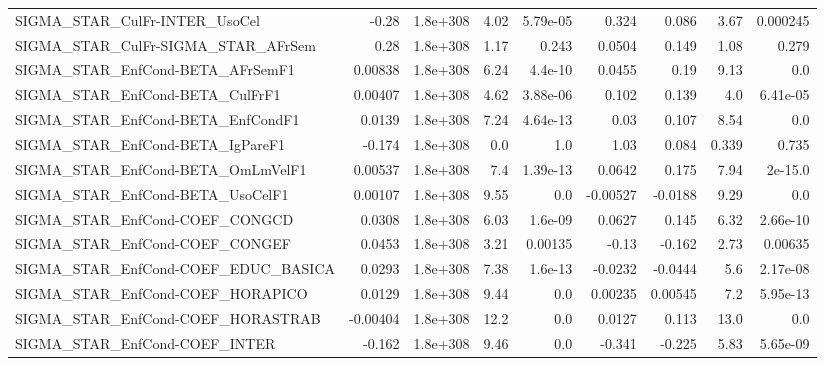 \begin{tabular}{lrrrrrrrr}
SIGMA\_STAR\_CulFr-INTER\_UsoCel         &       -0.28 &     1.8e+308 &    4.02 & 5.79e-05 &      0.324 &       0.086 &         3.67 &      0.000245 \\
SIGMA\_STAR\_CulFr-SIGMA\_STAR\_AFrSem    &        0.28 &     1.8e+308 &    1.17 &    0.243 &     0.0504 &       0.149 &         1.08 &         0.279 \\
SIGMA\_STAR\_EnfCond-BETA\_AFrSemF1      &     0.00838 &     1.8e+308 &    6.24 &  4.4e-10 &     0.0455 &        0.19 &         9.13 &           0.0 \\
SIGMA\_STAR\_EnfCond-BETA\_CulFrF1       &     0.00407 &     1.8e+308 &    4.62 & 3.88e-06 &      0.102 &       0.139 &          4.0 &      6.41e-05 \\
SIGMA\_STAR\_EnfCond-BETA\_EnfCondF1     &      0.0139 &     1.8e+308 &    7.24 & 4.64e-13 &       0.03 &       0.107 &         8.54 &           0.0 \\
SIGMA\_STAR\_EnfCond-BETA\_IgPareF1      &      -0.174 &     1.8e+308 &     0.0 &      1.0 &       1.03 &       0.084 &        0.339 &         0.735 \\
SIGMA\_STAR\_EnfCond-BETA\_OmLmVelF1     &     0.00537 &     1.8e+308 &     7.4 & 1.39e-13 &     0.0642 &       0.175 &         7.94 &       2e-15.0 \\
SIGMA\_STAR\_EnfCond-BETA\_UsoCelF1      &     0.00107 &     1.8e+308 &    9.55 &      0.0 &   -0.00527 &     -0.0188 &         9.29 &           0.0 \\
SIGMA\_STAR\_EnfCond-COEF\_CONGCD        &      0.0308 &     1.8e+308 &    6.03 &  1.6e-09 &     0.0627 &       0.145 &         6.32 &      2.66e-10 \\
SIGMA\_STAR\_EnfCond-COEF\_CONGEF        &      0.0453 &     1.8e+308 &    3.21 &  0.00135 &      -0.13 &      -0.162 &         2.73 &       0.00635 \\
SIGMA\_STAR\_EnfCond-COEF\_EDUC\_BASICA   &      0.0293 &     1.8e+308 &    7.38 &  1.6e-13 &    -0.0232 &     -0.0444 &          5.6 &      2.17e-08 \\
SIGMA\_STAR\_EnfCond-COEF\_HORAPICO      &      0.0129 &     1.8e+308 &    9.44 &      0.0 &    0.00235 &     0.00545 &          7.2 &      5.95e-13 \\
SIGMA\_STAR\_EnfCond-COEF\_HORASTRAB     &    -0.00404 &     1.8e+308 &    12.2 &      0.0 &     0.0127 &       0.113 &         13.0 &           0.0 \\
SIGMA\_STAR\_EnfCond-COEF\_INTER         &      -0.162 &     1.8e+308 &    9.46 &      0.0 &     -0.341 &      -0.225 &         5.83 &      5.65e-09 \\

\end{tabular}
